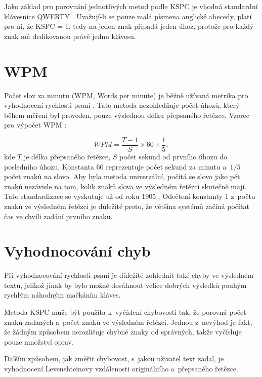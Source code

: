 \documentclass[a4paper,11pt,openany]{book} %
\begin{document}
Jako základ pro porovnání jednotlivých metod podle KSPC je vhodná standardní klávesnice QWERTY \parencite{arif2009analysis}. %
Uvažují-li se pouze malá písmena anglické abecedy, platí pro ni, že KSPC = 1, tedy na jeden znak připadá jeden úhoz, protože pro každý znak má dedikovanou právě jednu klávesu.

\section{WPM}

Počet slov za minutu (WPM, Words per minute) je běžně užívaná metrika pro vyhodnocení rychlosti psaní \parencite{tarvainen2010beginner}. %
Tato metoda nezohledňuje počet úhozů, který během měření byl proveden, pouze výslednou délku přepsaného řetězce. Vzorec pro výpočet WPM \parencite[48]{wobbrockjacobo.2007}:

\[
	WPM = \frac{T - 1}{S} \times 60 \times \frac{1}{5},
\]
kde $T$ je délka přepsaného řetězce, $S$ počet sekund od prvního úhozu do posledního úhozu. Konstanta $60$ reprezentuje počet sekund za minutu a~$1/5$ počet znaků na slovo. Aby byla metoda univerzální, počítá se slovo jako pět znaků nezávisle na tom, kolik znaků slova ve výsledném řetězci skutečně mají. Tato standardizace se vyskutuje už od roku 1905 \parencite{yamada1980historical}. Odečtení konstanty $1$ z~počtu znaků ve výsledném řetězci je důležité proto, že většina systémů začíná počítat čas ve chvíli zadání prvního znaku. \parencite[49]{wobbrockjacobo.2007}

\section{Vyhodnocování chyb}

Při vyhodnocování rychlosti psaní je důležité zohlednit také chyby ve výsledném textu, jelikož jinak by bylo možné dosáhnout velice dobrých výsledků pouhým rychlým náhodným mačkáním kláves.

Metoda KSPC může být použita k~vyčíslení chybovosti tak, že porovná počet znaků zadaných a~počet znaků ve výsledném řetězci. Jednou z~nevýhod je fakt, že žádným způsobem nerozlišuje chybné znaky od správných, takže vyčísluje pouze množství oprav. %

Dalším způsobem, jak změřit chybovost, s~jakou uživatel text zadal, je vyhodnocení Levenshteinovy vzdálenosti originálního a~přepsaného řetězce. \parencite{soukoreff2001measuring} %
\end{document}
